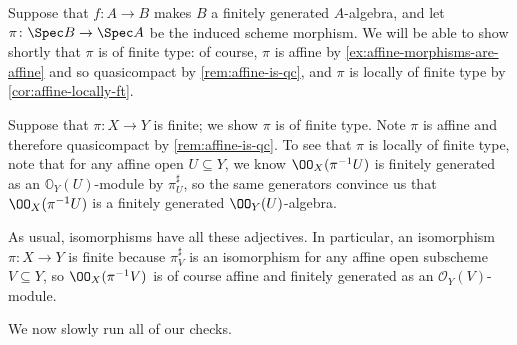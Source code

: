 \documentclass[../notes.tex]{subfiles}
\begin{document}
\begin{example}
	Suppose that $f\colon A\to B$ makes $B$ a finitely generated $A$-algebra, and let $\pi\colon\Spec B\to\Spec A$ be the induced scheme morphism. We will be able to show shortly that $\pi$ is of finite type: of course, $\pi$ is affine by \autoref{ex:affine-morphisms-are-affine} and so quasicompact by \autoref{rem:affine-is-qc}, and $\pi$ is locally of finite type by \autoref{cor:affine-locally-ft}.
\end{example}
\begin{example} \label{ex:finite-is-ft}
	Suppose that $\pi\colon X\to Y$ is finite; we show $\pi$ is of finite type. Note $\pi$ is affine and therefore quasicompact by \autoref{rem:affine-is-qc}. To see that $\pi$ is locally of finite type, note that for any affine open $U\subseteq Y$, we know $\OO_X(\pi^{-1}U)$ is finitely generated as an $\mathbb O_Y(U)$-module by $\pi^\sharp_U$, so the same generators convince us that $\OO_X(\pi^{-1}U)$ is a finitely generated $\OO_Y(U)$-algebra.
\end{example}
\begin{example}
	As usual, isomorphisms have all these adjectives. In particular, an isomorphism $\pi\colon X\to Y$ is finite because $\pi^\sharp_V$ is an isomorphism for any affine open subscheme $V\subseteq Y$, so $\OO_X(\pi^{-1}V)$ is of course affine and finitely generated as an $\mathcal O_Y(V)$-module.
\end{example}
We now slowly run all of our checks.
\end{document}
